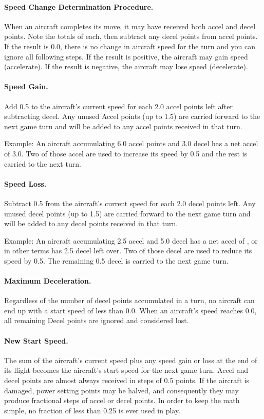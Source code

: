\paragraph{Speed Change Determination Procedure.} When an aircraft completes its move, it may have received both accel and decel points. Note the totals of each, then subtract any decel points from accel points. If the result is 0.0, there is no change in aircraft speed for the turn and you can ignore all following steps. If the result is positive, the aircraft may gain speed (accelerate). If the result is negative, the aircraft may lose speed (decelerate).

\paragraph{Speed Gain.}
Add 0.5 to the aircraft's current speed for each 2.0 accel points left after subtracting decel.  Any unused Accel points (up to 1.5) are carried forward to the next game turn and will be added to any accel points received in that turn.

Example: An aircraft accumulating 6.0 accel points and 3.0 decel has a net accel of 3.0. Two of those accel are used to increase its speed by 0.5 and the rest is carried to the next turn.

\paragraph{Speed Loss.} 
Subtract 0.5 from the aircraft's current speed for each 2.0 decel points left. Any unused decel points (up to 1.5) are carried forward to the next game turn and will be added to any decel points received in that turn.

Example: An aircraft accumulating 2.5 accel and 5.0 decel has a net accel of , or in other terms has 2.5 decel left over. Two of those decel are used to reduce its speed by 0.5. The remaining 0.5 decel is carried to the next game turn.

\paragraph{Maximum Deceleration.} 
Regardless of the number of decel points accumulated in a turn, no aircraft can end up with a start speed of less than 0.0. When an aircraft's speed reaches 0.0, all remaining Decel points are ignored and considered lost.

\paragraph{New Start Speed.} 
The sum of the aircraft's current speed plus any speed gain or loss at the end of its flight becomes the aircraft's start speed for the next game turn. Accel and decel points are almost always received in steps of 0.5 points. If the aircraft is damaged, power setting points may be halved, and consequently they may produce fractional steps of accel or decel points. In order to keep the math simple, no fraction of less than 0.25 is ever used in play.


